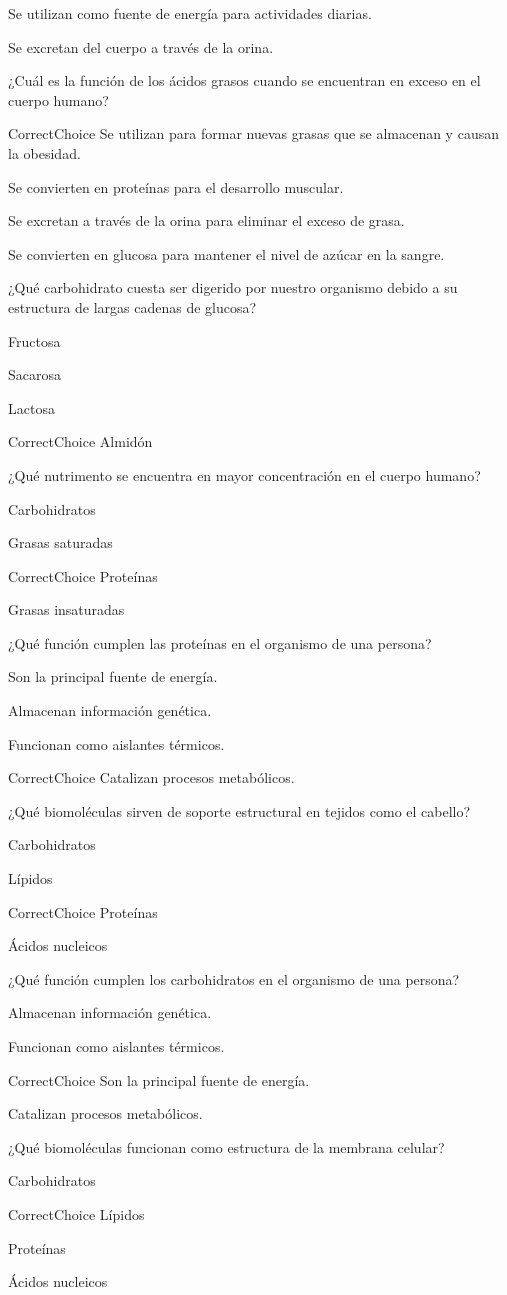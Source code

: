 \documentclass[12pt,addpoints]{repaso}
\begin{document}
\begin{questions}
{        Se utilizan como fuente de energía para actividades diarias.

        Se excretan del cuerpo a través de la orina.


        ¿Cuál es la función de los ácidos grasos cuando se encuentran en exceso en el cuerpo humano?

        CorrectChoice Se utilizan para formar nuevas grasas que se almacenan y causan la obesidad.

        Se convierten en proteínas para el desarrollo muscular.

        Se excretan a través de la orina para eliminar el exceso de grasa.

        Se convierten en glucosa para mantener el nivel de azúcar en la sangre.


        ¿Qué carbohidrato cuesta ser digerido por nuestro organismo debido a su estructura de largas cadenas de glucosa?

        Fructosa

        Sacarosa

        Lactosa

        CorrectChoice Almidón


        ¿Qué nutrimento se encuentra en mayor concentración en el cuerpo humano?

        Carbohidratos

        Grasas saturadas

        CorrectChoice Proteínas

        Grasas insaturadas


        ¿Qué función cumplen las proteínas en el organismo de una persona?

        Son la principal fuente de energía.

        Almacenan información genética.

        Funcionan como aislantes térmicos.

        CorrectChoice Catalizan procesos metabólicos.


        ¿Qué biomoléculas sirven de soporte estructural en tejidos como el cabello?

        Carbohidratos

        Lípidos

        CorrectChoice Proteínas

        Ácidos nucleicos


        ¿Qué función cumplen los carbohidratos en el organismo de una persona?


        Almacenan información genética.

        Funcionan como aislantes térmicos.

        CorrectChoice Son la principal fuente de energía.

        Catalizan procesos metabólicos.


        ¿Qué biomoléculas funcionan como estructura de la membrana celular?

        Carbohidratos

        CorrectChoice Lípidos

        Proteínas

        Ácidos nucleicos
    }
\end{questions}
\end{document}
